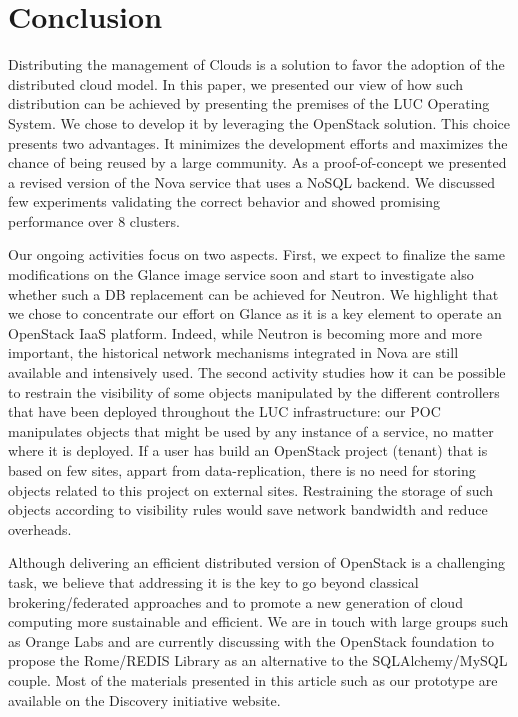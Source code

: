 \section{Conclusion\label{sec:conclusion}}

Distributing the management of Clouds is a solution to favor the adoption of the distributed cloud model. In this paper, we presented our view of how
such distribution can be achieved by presenting the premises of the LUC Operating System.
We chose to develop it by leveraging the OpenStack solution. This choice
presents two advantages. It minimizes the development efforts and maximizes the
chance of being reused by a large community. As a proof-of-concept we presented
a revised version of the Nova service that uses a NoSQL backend. We discussed
few experiments validating the correct behavior and showed promising performance
over 8 clusters.
 
Our ongoing activities focus on two aspects. First, we expect
to finalize the same modifications on the Glance image service soon and start to
investigate also whether such a DB replacement can be achieved for Neutron. We
highlight that we chose to concentrate our effort on Glance as it is a key
element to operate an OpenStack IaaS platform. Indeed, while Neutron is becoming
more and more important, the historical network mechanisms integrated in Nova
are still available and intensively used. The second activity studies how it can
be possible to restrain the visibility of some objects manipulated by the
different controllers that have been deployed throughout the LUC infrastructure:
our POC manipulates objects that might be used by any instance of a service, no
matter where it is deployed.
If a user has build an OpenStack project (tenant) that is based on few sites,
appart from data-replication, there is no need for storing objects related to
this project on external sites. Restraining the storage of such objects
according to visibility rules would save network bandwidth and reduce
overheads.%

Although delivering an efficient distributed version of OpenStack is a
challenging task, we believe that addressing it is the key to go beyond
classical brokering/federated approaches and to promote a new generation of
cloud computing more sustainable and efficient. We are in touch with large
groups such as Orange Labs and are currently discussing with the OpenStack
foundation to propose the Rome/REDIS Library as an alternative to the
SQLAlchemy/MySQL couple. Most of the materials presented in this article such as
our prototype are available on the Discovery initiative website.

